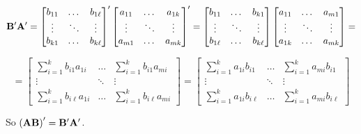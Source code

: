 \begin{enumerate}[label=(\alph*)]
            \[
                \bold{B}^\prime \bold{A}^\prime = 
                \begin{bmatrix}
                    b_{11} & \dots & b_{1\ell} \\
                    \vdots & \ddots & \vdots \\
                    b_{k1} & \dots & b_{k\ell}
                \end{bmatrix}^\prime
                \begin{bmatrix}
                    a_{11} & \dots & a_{1k} \\
                    \vdots & \ddots & \vdots \\
                    a_{m1} & \dots & a_{mk}
                \end{bmatrix}^\prime =
                \begin{bmatrix}
                    b_{11} & \dots & b_{k1} \\
                    \vdots & \ddots & \vdots \\
                    b_{1\ell} & \dots & b_{k\ell}
                \end{bmatrix}
                \begin{bmatrix}
                    a_{11} & \dots & a_{m1} \\
                    \vdots & \ddots & \vdots \\
                    a_{1k} & \dots & a_{mk}
                \end{bmatrix} =
            \]

            \[
                = \begin{bmatrix}
                    \sum_{i=1}^k{b_{i1}a_{1i}} & \dots & \sum_{i=1}^k{b_{i1}a_{mi}} \\
                    \vdots & \ddots & \vdots \\
                    \sum_{i=1}^k{b_{i\ell}a_{1i}} & \dots & \sum_{i=1}^k{b_{i\ell}a_{mi}}
                \end{bmatrix} = \begin{bmatrix}
                    \sum_{i=1}^k{a_{1i}b_{i1}} & \dots & \sum_{i=1}^k{a_{mi}b_{i1}} \\
                    \vdots & \ddots & \vdots \\
                    \sum_{i=1}^k{a_{1i}b_{i\ell}} & \dots & \sum_{i=1}^k{a_{mi}b_{i\ell}}
                \end{bmatrix}
            \]
        \end{enumerate}
        So ${\left(\bold{AB}\right)}^\prime = \bold{B}^\prime\bold{A}^\prime$.